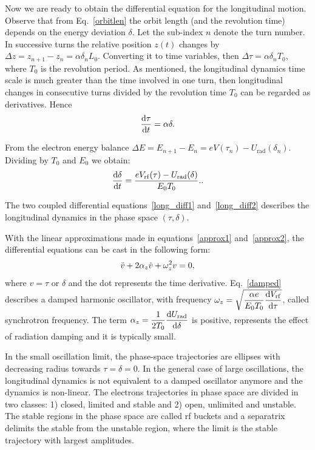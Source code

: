 Now we are ready to obtain the differential equation for the longitudinal motion. Observe that from Eq.~\eqref{orbitlen} the orbit length (and the revolution time) depends on the energy deviation $\delta$. Let the sub-index $n$ denote the turn number. In successive turns the relative position $z(t)$ changes by $\Delta z = z_{n+1} - z_n = \alpha\delta_n L_0$. Converting it to time variables, then $\Delta \tau = \alpha \delta_n T_0$, where $T_0$ is the revolution period. As mentioned, the longitudinal dynamics time scale is much greater than the time involved in one turn, then longitudinal changes in consecutive turns divided by the revolution time $T_0$ can be regarded as derivatives. Hence
\begin{equation}
    \dfrac{\mathrm{d} \tau}{\mathrm{d} t} = \alpha \delta.
    \label{long_diff1}
\end{equation}

From the electron energy balance $\Delta E = E_{n+1} - E_n = eV(\tau_n) - U_{\mathrm{rad}}(\delta_n)$. Dividing by $T_0$ and $E_0$ we obtain:
\begin{equation}
    \dfrac{\mathrm{d} \delta}{\mathrm{d} t} = \dfrac{eV_{\mathrm{rf}}(\tau) - U_{\mathrm{rad}}(\delta)}{E_0 T_0}.
    \label{long_diff2}.
\end{equation}

The two coupled differential equations~\eqref{long_diff1} and~\eqref{long_diff2} describes the longitudinal dynamics in the phase space $(\tau, \delta)$.

With the linear approximations made in equations~\eqref{approx1} and~\eqref{approx2}, the differential equations can be cast in the following form:
\begin{equation}
    \Ddot{v} + 2\alpha_{z} \dot{v} + \omega_{z}^2 v = 0,
    \label{damped}
\end{equation}
where $v=\tau$ or $\delta$ and the dot represents the time derivative. Eq.~\eqref{damped} describes a damped harmonic oscillator, with frequency $\omega_z = \sqrt{\dfrac{\alpha e}{E_0 T_0} \dfrac{\mathrm{d} V_{\mathrm{rf}}}{\mathrm{d} \tau}}$, called synchrotron frequency. The term $\alpha_z = \dfrac{1}{2T_0} \dfrac{\mathrm{d} U_{\mathrm{rad}}}{\mathrm{d} \delta}$ is positive, represents the effect of radiation damping and it is typically small. 

In the small oscillation limit, the phase-space trajectories are ellipses with decreasing radius towards $\tau = \delta = 0$. In the general case of large oscillations, the longitudinal dynamics is not equivalent to a damped oscillator anymore and the dynamics is non-linear. The electrons trajectories in phase space are divided in two classes: 1) closed, limited and stable and 2) open, unlimited and unstable. The stable regions in the phase space are called \gls{rf} buckets and a separatrix delimits the stable from the unstable region, where the limit is the stable trajectory with largest amplitudes.

